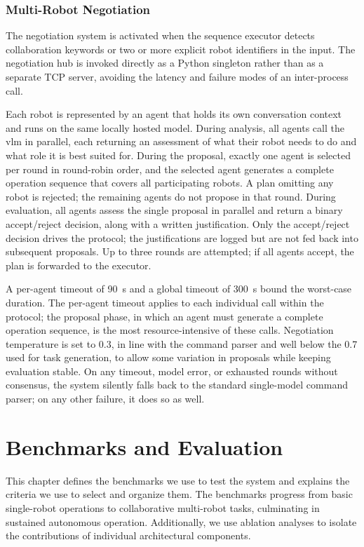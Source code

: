 \documentclass[
     12pt,
     a4paper,
     BCOR=10mm,
     DIV=14,
     listof=totoc,
     bibliography=totoc,
     parskip,
     twoside,
     headsepline
     ]{scrreprt}
\begin{document}
\subsection{Multi-Robot Negotiation}
The negotiation system is activated when the sequence executor detects collaboration keywords or two or more explicit robot identifiers in the input. The negotiation hub is invoked directly as a Python singleton rather than as a separate TCP server, avoiding the latency and failure modes of an inter-process call.

Each robot is represented by an agent that holds its own conversation context and runs on the same locally hosted model. During analysis, all agents call the \gls{vlm} in parallel, each returning an assessment of what their robot needs to do and what role it is best suited for. During the proposal, exactly one agent is selected per round in round-robin order, and the selected agent generates a complete operation sequence that covers all participating robots. A plan omitting any robot is rejected; the remaining agents do not propose in that round. During evaluation, all agents assess the single proposal in parallel and return a binary accept/reject decision, along with a written justification. Only the accept/reject decision drives the protocol; the justifications are logged but are not fed back into subsequent proposals. Up to three rounds are attempted; if all agents accept, the plan is forwarded to the executor.

A per-agent timeout of 90~s and a global timeout of 300~s bound the worst-case duration. The per-agent timeout applies to each individual call within the protocol; the proposal phase, in which an agent must generate a complete operation sequence, is the most resource-intensive of these calls. Negotiation temperature is set to 0.3, in line with the command parser and well below the 0.7 used for task generation, to allow some variation in proposals while keeping evaluation stable. On any timeout, model error, or exhausted rounds without consensus, the system silently falls back to the standard single-model command parser; on any other failure, it does so as well.

\chapter{Benchmarks and Evaluation}\label{evaluation}
This chapter defines the benchmarks we use to test the system and explains the criteria we use to select and organize them. The benchmarks progress from basic single-robot operations to collaborative multi-robot tasks, culminating in sustained autonomous operation. Additionally, we use ablation analyses to isolate the contributions of individual architectural components.
\end{document}

